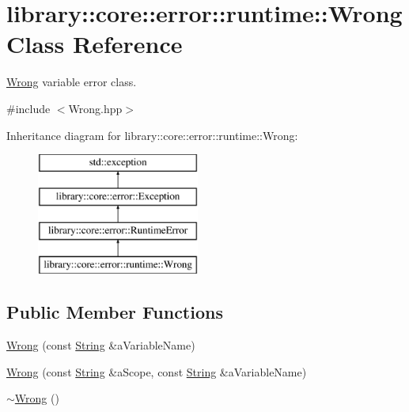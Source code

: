 \hypertarget{classlibrary_1_1core_1_1error_1_1runtime_1_1_wrong}{}\section{library\+:\+:core\+:\+:error\+:\+:runtime\+:\+:Wrong Class Reference}
\label{classlibrary_1_1core_1_1error_1_1runtime_1_1_wrong}


\hyperlink{classlibrary_1_1core_1_1error_1_1runtime_1_1_wrong}{Wrong} variable error class.  




{\ttfamily \#include $<$Wrong.\+hpp$>$}

Inheritance diagram for library\+:\+:core\+:\+:error\+:\+:runtime\+:\+:Wrong\+:\begin{figure}[H]
\begin{center}
\leavevmode
\includegraphics[height=4.000000cm]{classlibrary_1_1core_1_1error_1_1runtime_1_1_wrong}
\end{center}
\end{figure}
\subsection*{Public Member Functions}
\begin{DoxyCompactItemize}
\item 
\hyperlink{classlibrary_1_1core_1_1error_1_1runtime_1_1_wrong_acb341a0822b64bfa2d8cdf7963b24f96}{Wrong} (const \hyperlink{classlibrary_1_1core_1_1types_1_1_string}{String} \&a\+Variable\+Name)
\item 
\hyperlink{classlibrary_1_1core_1_1error_1_1runtime_1_1_wrong_a413ec4868a4a3283cc0a1dcd2882ad1e}{Wrong} (const \hyperlink{classlibrary_1_1core_1_1types_1_1_string}{String} \&a\+Scope, const \hyperlink{classlibrary_1_1core_1_1types_1_1_string}{String} \&a\+Variable\+Name)
\item 
\hyperlink{classlibrary_1_1core_1_1error_1_1runtime_1_1_wrong_a6cdcfe31f32807b295695b9bd288d1cf}{$\sim$\+Wrong} ()
\end{DoxyCompactItemize}


